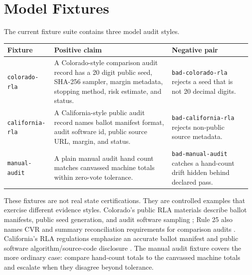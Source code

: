 \section{Model Fixtures}

The current fixture suite contains three model audit styles.

\begin{center}
\small
\begin{tabularx}{\textwidth}{lXX}
\toprule
Fixture & Positive claim & Negative pair \\
\midrule
\texttt{colorado-rla} & A Colorado-style comparison audit record has a 20 digit public seed, SHA-256 sampler, margin metadata, stopping method, risk estimate, and status. & \texttt{bad-colorado-rla} rejects a seed that is not 20 decimal digits. \\
\texttt{california-rla} & A California-style public audit record names ballot manifest format, audit software id, public source URL, margin, and status. & \texttt{bad-california-rla} rejects non-public source metadata. \\
\texttt{manual-audit} & A plain manual audit hand count matches canvassed machine totals within zero-vote tolerance. & \texttt{bad-manual-audit} catches a hand-count drift hidden behind declared pass. \\
\bottomrule
\end{tabularx}
\end{center}

These fixtures are not real state certifications. They are controlled examples
that exercise different evidence styles. Colorado's public RLA materials
describe ballot manifests, public seed generation, and audit software sampling
\citep{colorado-rla-faq}; Rule 25 also names CVR and summary reconciliation
requirements for comparison audits \citep{colorado-rule-25}. California's RLA
regulations emphasize an accurate ballot manifest and public software
algorithm/source-code disclosure \citep{california-rla-regulations}. The manual
audit fixture covers the more ordinary case: compare hand-count totals to the
canvassed machine totals and escalate when they disagree beyond tolerance.
